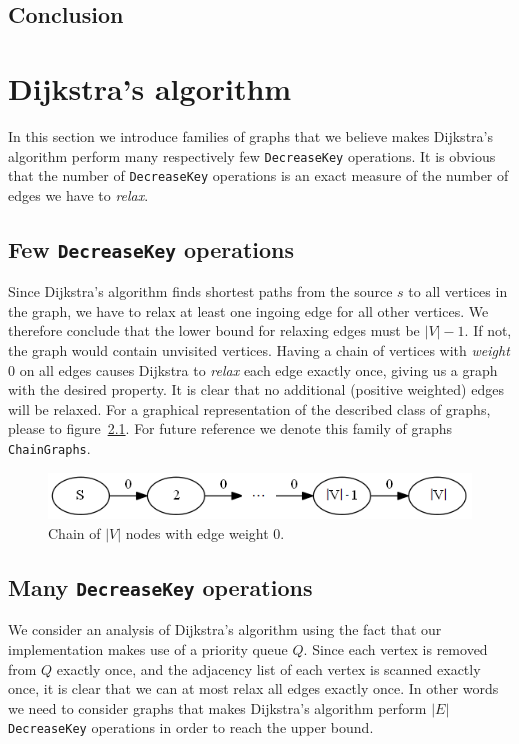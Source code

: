 \documentclass[a4paper,oneside,article,11pt]{memoir}
\begin{document}
\section{Conclusion}

\chapter{Dijkstra's algorithm}
\label{cpt:dijkstra}
In this section we introduce families of graphs that we believe makes Dijkstra's algorithm perform many respectively few \texttt{DecreaseKey} operations. It is obvious that the number of \texttt{DecreaseKey} operations is an exact measure of the number of edges we have to \textit{relax}.

\section{Few \texttt{DecreaseKey} operations}
\label{sec:few_decreasekey}
Since Dijkstra's algorithm finds shortest paths from the source $s$ to all vertices in the graph, we have to relax at least one ingoing edge for all other vertices. We therefore conclude that the lower bound for relaxing edges must be $\vert V \vert -1$. If not, the graph would contain unvisited vertices. Having a chain of vertices with \textit{weight} 0 on all edges causes Dijkstra to \textit{relax} each edge exactly once, giving us a graph with the desired property. It is clear that no additional (positive weighted) edges will be relaxed. For a graphical representation of the described class of graphs, please to figure~\ref{figure:graph_chain}. For future reference we denote this family of graphs \texttt{ChainGraphs}.

\begin{figure}[H]
\centering
\centerline {
  \includegraphics[scale=1]{../figures/graph_chain.png}
}
\caption{Chain of $\vert V \vert$ nodes with edge weight 0.}
\label{figure:graph_chain}
\end{figure}

\section{Many \texttt{DecreaseKey} operations}
\label{sec:many_decreasekey}
We consider an analysis of Dijkstra's algorithm using the fact that our implementation makes use of a priority queue $Q$. Since each vertex is removed from $Q$ exactly once, and the adjacency list of each vertex is scanned exactly once, it is clear that we can at most relax all edges exactly once.
In other words we need to consider graphs that makes Dijkstra's algorithm perform $\vert E \vert$ \texttt{DecreaseKey} operations in order to reach the upper bound.
\end{document}
